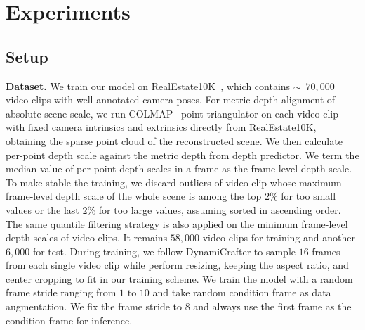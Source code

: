 \section{Experiments}
\label{sec:experiments}



\subsection{Setup}



\noindent\textbf{Dataset.} We train our model on RealEstate10K~\cite{zhou2018stereo}, which contains \(\sim\)~\(70,000\) video clips with well-annotated camera poses. 
For metric depth alignment of absolute scene scale, we run COLMAP~\cite{Schonberger2016} point triangulator on each video clip with fixed camera intrinsics and extrinsics directly from RealEstate10K, obtaining the sparse point cloud of the reconstructed scene.
We then calculate per-point depth scale against the metric depth from depth predictor.
We term the median value of per-point depth scales in a frame as the frame-level depth scale. 
To make stable the training, we discard outliers of video clip whose maximum frame-level depth scale of the whole scene is among the top \(2\%\) for too small values or the last \(2\%\) for too large values, assuming sorted in ascending order.
The same quantile filtering strategy is also applied on the minimum frame-level depth scales of video clips.
It remains \(58,000\) video clips for training and another \(6,000\) for test.
During training, we follow DynamiCrafter to sample \(16\) frames from each single video clip while perform resizing, keeping the aspect ratio, and center cropping to fit in our training scheme.
We train the model with a random frame stride ranging from \(1\) to \(10\) and take random condition frame as data augmentation.
We fix the frame stride to \(8\) and always use the first frame as the condition frame for inference.

